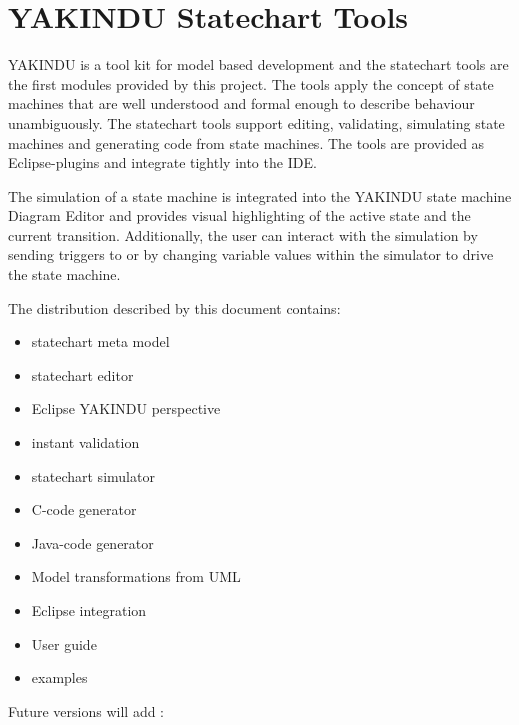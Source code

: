 %
\section{YAKINDU Statechart Tools}

YAKINDU is a tool kit for model based development and the statechart tools are
the first modules provided by this project. The tools apply the concept of
state machines that are well understood and formal enough to describe
behaviour unambiguously. The statechart tools support editing, validating,
simulating state machines and generating code from state machines. The tools
are provided as Eclipse-plugins and integrate tightly into the IDE.

The simulation of a state machine is integrated into the YAKINDU state machine
Diagram Editor and provides visual highlighting of the active state and the
current transition. Additionally, the user can interact with the simulation by
sending triggers to or by changing variable values within the simulator to
drive the state machine.

The distribution described by this document contains:

\begin{itemize}
\item statechart meta model
\item statechart editor
\item Eclipse YAKINDU perspective
\item instant validation
\item statechart simulator
\item C-code generator
\item Java-code generator
\item Model transformations from UML
\item Eclipse integration 
\item User guide
\item examples
\end{itemize}

Future versions will add :

